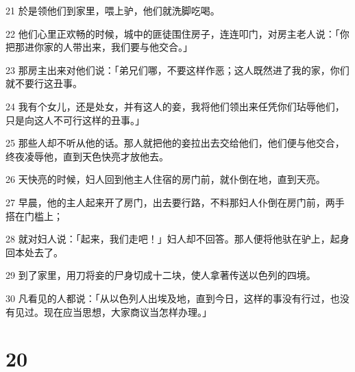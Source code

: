 \par 21 於是领他们到家里，喂上驴，他们就洗脚吃喝。
\par 22 他们心里正欢畅的时候，城中的匪徒围住房子，连连叩门，对房主老人说：「你把那进你家的人带出来，我们要与他交合。」
\par 23 那房主出来对他们说：「弟兄们哪，不要这样作恶；这人既然进了我的家，你们就不要行这丑事。
\par 24 我有个女儿，还是处女，并有这人的妾，我将他们领出来任凭你们玷辱他们，只是向这人不可行这样的丑事。」
\par 25 那些人却不听从他的话。那人就把他的妾拉出去交给他们，他们便与他交合，终夜凌辱他，直到天色快亮才放他去。
\par 26 天快亮的时候，妇人回到他主人住宿的房门前，就仆倒在地，直到天亮。
\par 27 早晨，他的主人起来开了房门，出去要行路，不料那妇人仆倒在房门前，两手搭在门槛上；
\par 28 就对妇人说：「起来，我们走吧！」妇人却不回答。那人便将他驮在驴上，起身回本处去了。
\par 29 到了家里，用刀将妾的尸身切成十二块，使人拿著传送以色列的四境。
\par 30 凡看见的人都说：「从以色列人出埃及地，直到今日，这样的事没有行过，也没有见过。现在应当思想，大家商议当怎样办理。」

\chapter{20}

